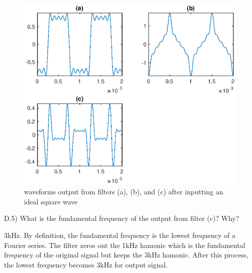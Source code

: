 

\begin{figure}[htbp]
  \centering
  \includegraphics [width=\textwidth]{matlab/fig/D_r_4.eps}
  \caption{waveforms output from filters (a), (b), and (c) after inputting an ideal square wave}    
  \label{fig:D_r_4}
\end{figure}

\begin{tcolorbox}
  D.5) What is the fundamental frequency of the output from filter (c)? Why?
\end{tcolorbox}

3kHz. By definition, the fundamental frequency is the lowest frequency of a Fourier series. The filter zeros out the 1kHz hamonic which is the fundamental frequency of the original signal but keeps the 3kHz hamonic. After this process, the lowest frequency becomes 3kHz for output signal.

\pagebreak